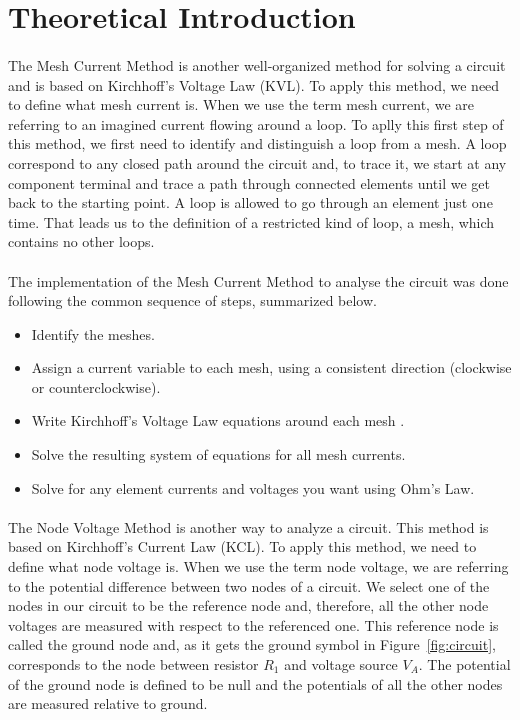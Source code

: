 \section{Theoretical Introduction}
\label{sec:theoretical}

\paragraph{}
The Mesh Current Method is another well-organized method for solving a circuit and is based on Kirchhoff's Voltage Law (KVL). To apply this method, we need to define what mesh current is. When we use the term mesh current, we are referring to an imagined current flowing around a loop. To aplly this first step of this method, we first need to identify and distinguish a loop from a mesh. A loop correspond to any closed path around the circuit and, to trace it, we start at any component terminal and trace a path through connected elements until we get back to the starting point. A loop is allowed to go through an element just one time. That leads us to the definition of a restricted kind of loop, a mesh, which contains no other loops.

\paragraph{}
The implementation of the Mesh Current Method to analyse the circuit was done following the common sequence of steps, summarized below.
\begin{itemize}
    \item Identify the meshes.
    \item Assign a current variable to each mesh, using a consistent direction (clockwise or counterclockwise).
    \item Write Kirchhoff's Voltage Law equations around each mesh .
    \item Solve the resulting system of equations for all mesh currents.
    \item Solve for any element currents and voltages you want using Ohm's Law.
\end{itemize}

\paragraph{}
The Node Voltage Method is another way to analyze a circuit. This method is based on Kirchhoff's Current Law (KCL). To apply this method, we need to define what node voltage is. When we use the term node voltage, we are referring to the potential difference between two nodes of a circuit. We select one of the nodes in our circuit to be the reference node and, therefore, all the other node voltages are measured with respect to the referenced one. This reference node is called the ground node and, as it gets the ground symbol in Figure~\ref{fig:circuit}, corresponds to the node between resistor $R_1$ and voltage source $V_A$. The potential of the ground node is defined to be null and the potentials of all the other nodes are measured relative to ground.

